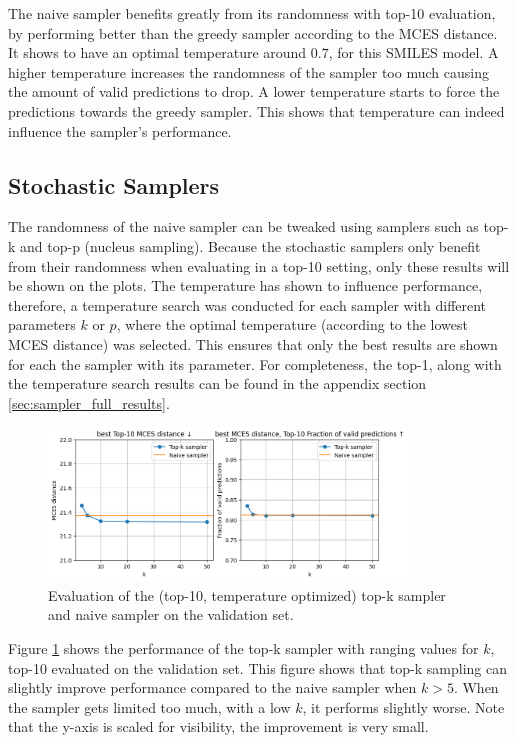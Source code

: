 The naive sampler benefits greatly from its randomness with top-10 evaluation, by performing better than the greedy sampler according to the MCES distance.
It shows to have an optimal temperature around $0.7$, for this SMILES model.
A higher temperature increases the randomness of the sampler too much causing the amount of valid predictions to drop.
A lower temperature starts to force the predictions towards the greedy sampler.
This shows that temperature can indeed influence the sampler's performance.

\subsection{Stochastic Samplers}

The randomness of the naive sampler can be tweaked using samplers such as top-k and top-p (nucleus sampling).
Because the stochastic samplers only benefit from their randomness when evaluating in a top-10 setting, only these results will be shown on the plots.
The temperature has shown to influence performance, therefore, a temperature search was conducted for each sampler with different parameters $k$ or $p$, where the optimal temperature (according to the lowest MCES distance) was selected.
This ensures that only the best results are shown for each the sampler with its parameter.
For completeness, the top-1, along with the temperature search results can be found in the appendix section \ref{sec:sampler_full_results}.

\begin{figure}[h]
    \centering
    \includegraphics[width=0.85\textwidth]{figures/results/samplers/top-k.png}
    \caption{Evaluation of the (top-10, temperature optimized) top-k sampler and naive sampler on the validation set.}
    \label{fig:top-k}
\end{figure}

Figure \ref{fig:top-k} shows the performance of the top-k sampler with ranging values for $k$, top-10 evaluated on the validation set.
This figure shows that top-k sampling can slightly improve performance compared to the naive sampler when $k > 5$.
When the sampler gets limited too much, with a low $k$, it performs slightly worse. 
Note that the y-axis is scaled for visibility, the improvement is very small.

